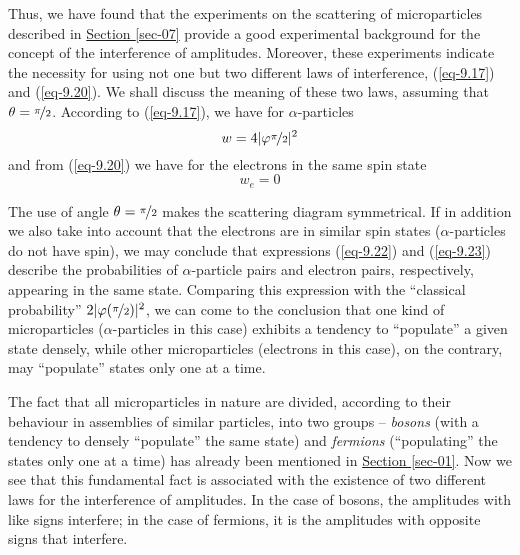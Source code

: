 \documentclass[a4paper,sfsidenotes,colorlinks=true]{tufte-book}
\numberwithin{equation}{section}
\numberwithin{figure}{section}
\begin{document}
Thus, we have found that the
experiments on the scattering of microparticles described in
\hyperref[sec-07]{Section \ref{sec-07}} provide a good experimental
background for the concept of the interference of
amplitudes. Moreover, these experiments indicate the necessity for
using not one but two different laws of interference, (\ref{eq-9.17}) and
(\ref{eq-9.20}). We shall discuss the meaning of these two laws, assuming that
$\theta = \nicefrac{\pi}{2}$. According to (\ref{eq-9.17}), we have for $\alpha$-particles
\begin{equation}%
w = 4 | \varphi  \nicefrac{\pi}{2} |^{2}	
\label{eq-9.22}
\end{equation}
and from (\ref{eq-9.20}) we have for the electrons in the same spin state
\begin{equation}%
w_{e} = 0
\label{eq-9.23}
\end{equation}

The use of angle $\theta = \nicefrac{\pi}{2}$ makes the scattering
diagram symmetrical. If in addition we also take into account that the
electrons are in similar spin states ($\alpha$-particles do not have
spin), we may conclude that expressions (\ref{eq-9.22}) and
(\ref{eq-9.23}) describe the probabilities of $\alpha$-particle pairs
and electron pairs, respectively, appearing in the same
state. Comparing this expression with the ``classical probability'' $2
| \varphi (\nicefrac{\pi}{2})|^{2}$, we can come to the conclusion
that one kind of microparticles ($\alpha$-particles in this case)
exhibits a tendency to ``populate'' a given state densely, while other microparticles (electrons in this case), on the contrary, may ``populate'' states only one at a time.

The fact that all microparticles in nature are divided, according to
their behaviour in assemblies of similar particles, into two groups --
\emph{bosons} (with a tendency to densely ``populate'' the same state) and \emph{fermions} (``populating'' the states only one at a time) has already been mentioned in \hyperref[sec-01]{Section \ref{sec-01}}. Now we see that this fundamental fact is associated with the existence of two different laws
for the interference of amplitudes. In the case of bosons, the
amplitudes with like signs interfere; in the case of fermions, it is
the amplitudes with opposite signs that interfere.
\end{document}

